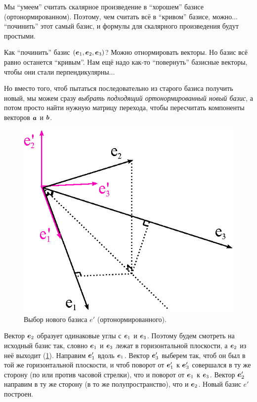 \documentclass[a4paper,12pt]{article}
\begin{document}
  \begin{solution}
    Мы ``умеем'' считать скалярное произведение в ``хорошем'' базисе (ортонормированном).
    Поэтому, чем считать всё в ``кривом'' базисе, можно... ``починить'' этот самый базис, и формулы для скалярного произведения будут простыми.
    
    Как ``починить'' базис $(\boldsymbol e_1, \boldsymbol e_2, \boldsymbol e_3)$?
    Можно отнормировать векторы.
    Но базис всё равно останется ``кривым''.
    Нам ещё надо как-то ``повернуть'' базисные векторы, чтобы они стали перпендикулярны...
    
    Но вместо того, чтоб пытаться последовательно из старого базиса получить новый, мы можем сразу \emph{выбрать подходящий ортонормированный новый базис}, а потом просто найти нужную матрицу перехода, чтобы пересчитать компоненты векторов $\boldsymbol a$ и $\boldsymbol b$.
    
    \begin{figure}[h]
      \centering
      
      \includegraphics[width=0.5\columnwidth]{making-bew-basis}
      
      \caption{Выбор нового базиса $e'$ (ортонормированного).}
      \label{fig:making-bew-basis}
    \end{figure}
    
    Вектор $\boldsymbol e_2$ образует одинаковые углы с $\boldsymbol e_1$ и $\boldsymbol e_3$.
    Поэтому будем смотреть на исходный базис так, словно $\boldsymbol e_1$ и $\boldsymbol e_3$ лежат в горизонтальной плоскости, а $\boldsymbol e_2$ из неё выходит (\ref{fig:making-bew-basis}).
    Направим $\boldsymbol e_1'$ вдоль $\boldsymbol e_1$.
    Вектор $\boldsymbol e_3'$ выберем так, чтоб он был в той же горизонтальной плоскости, и чтоб поворот от $\boldsymbol e_1'$ к $\boldsymbol e_3'$ совершался в ту же сторону (по или против часовой стрелки), что и поворот от $\boldsymbol e_1$ к $\boldsymbol e_3$.
    Вектор $\boldsymbol e_2'$ направим в ту же сторону (в то же полупространство), что и $\boldsymbol e_2$.
    Новый базис $e'$ построен.
    

\end{solution}
\end{document}
